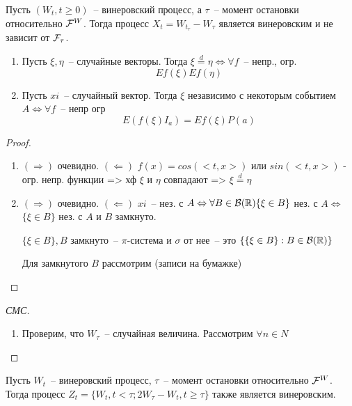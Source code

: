 \begin{theorem}
Пусть $(W_t, t \geq 0)$~-- винеровский процесс, а $\tau$~-- момент
остановки относительно $\mathcal{F}^W$. Тогда процесс
$X_t = W_{t_\tau} - W_\tau$ является винеровским и не зависит от $\mathcal{F}_\tau$.
\end{theorem}
\begin{lem}
\begin{enumerate}
\item Пусть $\xi, \eta$~-- случайные векторы. Тогда $\xi \overset{d}{=} \eta \Leftrightarrow
\forall f$~-- непр., огр.
$$Ef(\xi) Ef(\eta)$$
\item Пусть $xi$~-- случайный вектор. Тогда $\xi$ независимо с некоторым событием $A \Leftrightarrow
\forall f$~-- непр огр
$$E(f(\xi)I_a) = Ef(\xi) P(a)$$
\end{enumerate}
\end{lem}
\begin{proof}
\begin{enumerate}
\item $(\Rightarrow)$ очевидно.
$(\Leftarrow)$  $f(x) = cos(<t,x>)$ или $sin(<t, x>)$ - огр. непр. функции => хф $\xi$
и $\eta$ совпадают => $\xi \overset{d}{=} \eta$
\item $(\Rightarrow)$ очевидно.
$(\Leftarrow)$ $xi$~-- нез. с $A \Leftrightarrow \forall B \in \mathcal{B}(\mathbb{R})
\{\xi \in B\}$ нез. с $A \Leftrightarrow$
$\{\xi \in B\}$ нез. с $A$ и $B$ замкнуто.

$\{\xi \in B\}, B$ замкнуто~-- $\pi$-система и $\sigma$ от нее~--
это $\{\{\xi \in B\}: B \in \mathcal{B}(\mathbb{R})\}$

Для замкнутого $B$ рассмотрим (записи на бумажке)
\end{enumerate}
\end{proof}
\begin{proof}[СМС]
\begin{enumerate}
\item Проверим, что $W_\tau$~-- случайная величина. Рассмотрим $\forall n \in N$
\end{enumerate}
\end{proof}

\begin{theorem}
Пусть $W_t$~-- винеровский процесс, $\tau$~-- момент остановки относительно $\mathcal{F}^W$. Тогда
процесс $Z_t = \{W_t, t < \tau; 2W_\tau - W_t, t \geq \tau\}$ также является винеровским.

\end{theorem}

